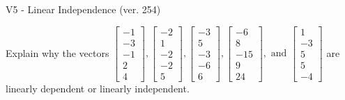 \begin{exercise}
  \begin{exerciseTitle}V5 - Linear Independence (ver. 254)\end{exerciseTitle}
  \begin{exerciseStatement}
    Explain why the vectors \(\left[\begin{array}{r}
-1 \\
-3 \\
-1 \\
2 \\
4
\end{array}\right] , \left[\begin{array}{r}
-2 \\
1 \\
-2 \\
-2 \\
5
\end{array}\right] , \left[\begin{array}{r}
-3 \\
5 \\
-3 \\
-6 \\
6
\end{array}\right] , \left[\begin{array}{r}
-6 \\
8 \\
-15 \\
9 \\
24
\end{array}\right] , \text{ and } \left[\begin{array}{r}
1 \\
-3 \\
5 \\
5 \\
-4
\end{array}\right]\) are linearly dependent or linearly independent.	



\end{exerciseStatement}
\end{exercise}
